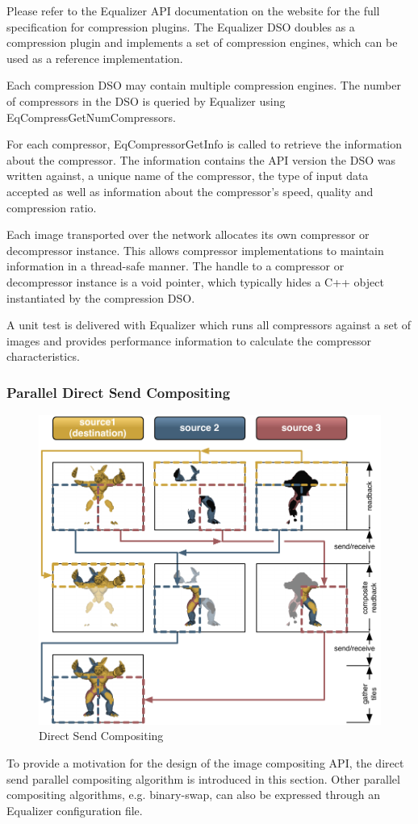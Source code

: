 \documentclass[10pt,a4]{scrartcl}
\begin{document}
Please refer to the Equalizer API documentation on the website for the
full specification for compression plugins. The Equalizer DSO doubles as
a compression plugin and implements a set of compression engines, which
can be used as a reference implementation.

Each compression DSO may contain multiple compression engines. The
number of compressors in the DSO is queried by Equalizer using
\textsf{EqCompressGetNumCompressors}. 

For each compressor, \textsf{EqCompressorGetInfo} is called to retrieve
the information about the compressor. The information contains the API
version the DSO was written against, a unique name of the compressor,
the type of input data accepted as well as information about the
compressor's speed, quality and compression ratio.

Each image transported over the network allocates its own compressor or
decompressor instance. This allows compressor implementations to
maintain information in a thread-safe manner. The handle to a compressor
or decompressor instance is a void pointer, which typically hides a C++
object instantiated by the compression DSO.

A unit test is delivered with Equalizer which runs all compressors
against a set of images and provides performance information to
calculate the compressor characteristics.



\subsubsection{\label{sDirectSend}Parallel Direct Send Compositing}

\begin{figure}
  \includegraphics[width=.618\textwidth]{images/directSend.pdf}
  {\caption{\label{fDirectSend}Direct Send Compositing}}
  \vspace{-3ex}
\end{figure}
To provide a motivation for the design of the image compositing
API, the direct send parallel compositing algorithm is introduced in this
section. Other parallel compositing algorithms, e.g. binary-swap, can
also be expressed through an Equalizer configuration file.
\end{document}
